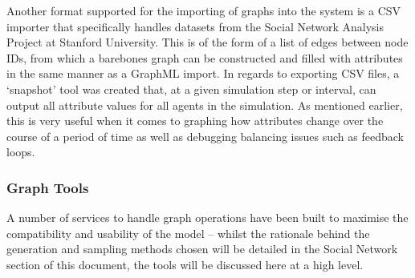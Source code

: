 \documentclass[]{report}
\begin{document}
Another format supported for the importing of graphs into the system is a CSV importer that specifically handles datasets from the Social Network Analysis Project at Stanford University\cite{SNAP}. This is of the form of a list of edges between node IDs, from which a barebones graph can be constructed and filled with attributes in the same manner as a GraphML import. In regards to exporting CSV files, a `snapshot' tool was created that, at a given simulation step or interval, can output all attribute values for all agents in the simulation. As mentioned earlier, this is very useful when it comes to graphing how attributes change over the course of a period of time as well as debugging balancing issues such as feedback loops.

\subsubsection{Graph Tools}
A number of services to handle graph operations have been built to maximise the compatibility and usability of the model – whilst the rationale behind the generation and sampling methods chosen will be detailed in the Social Network section of this document, the tools will be discussed here at a high level.
\end{document}
